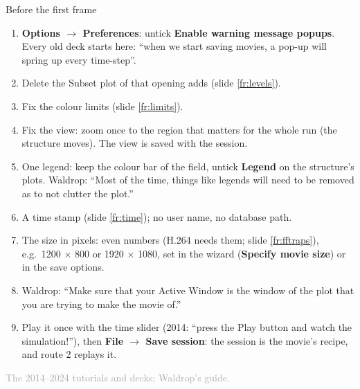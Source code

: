 \documentclass[aspectratio=169,11pt]{beamer}
\newcommand{\sourcecredit}[1]{\vfill\begin{flushright}\tiny\textcolor{DarkGray}{#1}\end{flushright}}
\newcommand{\gui}[1]{\textsf{\textbf{#1}}}
\begin{document}
\begin{frame}{Before the first frame}
\label{fr:before}
\footnotesize
\begin{enumerate}\setlength{\itemsep}{1pt}
  \item \gui{Options $\to$ Preferences}: untick \gui{Enable warning message popups}. Every old deck starts here: ``when we start saving movies, a pop-up will spring up every time-step''.
  \item Delete the Subset plot of  that opening  adds (slide \ref{fr:levels}).
  \item Fix the colour limits (slide \ref{fr:limits}).
  \item Fix the view: zoom once to the region that matters for the whole run (the structure moves). The view is saved with the session.
  \item One legend: keep the colour bar of the field, untick \gui{Legend} on the structure's plots. Waldrop: ``Most of the time, things like legends will need to be removed as to not clutter the plot.''
  \item A time stamp (slide \ref{fr:time}); no user name, no database path.
  \item The size in pixels: even numbers (H.264 needs them; slide \ref{fr:fftraps}), e.g.\ 1200 $\times$ 800 or 1920 $\times$ 1080, set in the wizard (\gui{Specify movie size}) or in the save options.
  \item Waldrop: ``Make sure that your Active Window is the window of the plot that you are trying to make the movie of.''
  \item Play it once with the time slider (2014: ``press the Play button and watch the simulation!''), then \gui{File $\to$ Save session}: the session is the movie's recipe, and route 2 replays it.
\end{enumerate}
\sourcecredit{The 2014--2024 tutorials and decks; Waldrop's guide.}
\end{frame}
\end{document}

